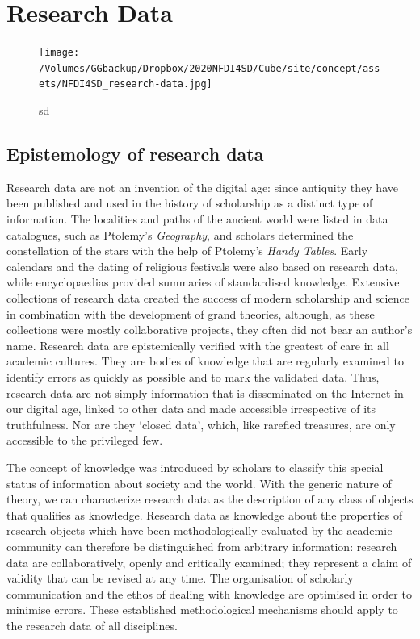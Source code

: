 \documentclass[
  english,
  paper=a4,
  oneside,captions=tableheading
]{scrbook}
\begin{document}
\hypertarget{research-data-1}{%
\section{Research Data}\label{research-data-1}}

\begin{figure}
\centering
\texttt{[image: /Volumes/GGbackup/Dropbox/2020NFDI4SD/Cube/site/concept/assets/NFDI4SD\_research-data.jpg]}
\caption{sd}
\end{figure}

\hypertarget{epistemology-of-research-data}{%
\subsection{Epistemology of research
data}\label{epistemology-of-research-data}}

Research data are not an invention of the digital age: since antiquity
they have been published and used in the history of scholarship as a
distinct type of information. The localities and paths of the ancient
world were listed in data catalogues, such as Ptolemy's
\emph{Geography}, and scholars determined the constellation of the stars
with the help of Ptolemy's \emph{Handy Tables}. Early calendars and the
dating of religious festivals were also based on research data, while
encyclopaedias provided summaries of standardised knowledge. Extensive
collections of research data created the success of modern scholarship
and science in combination with the development of grand theories,
although, as these collections were mostly collaborative projects, they
often did not bear an author's name. Research data are epistemically
verified with the greatest of care in all academic cultures. They are
bodies of knowledge that are regularly examined to identify errors as
quickly as possible and to mark the validated data. Thus, research data
are not simply information that is disseminated on the Internet in our
digital age, linked to other data and made accessible irrespective of
its truthfulness. Nor are they `closed data', which, like rarefied
treasures, are only accessible to the privileged few.

The concept of knowledge was introduced by scholars to classify this
special status of information about society and the world. With the
generic nature of theory, we can characterize research data as the
description of any class of objects that qualifies as knowledge.
Research data as knowledge about the properties of research objects
which have been methodologically evaluated by the academic community can
therefore be distinguished from arbitrary information: research data are
collaboratively, openly and critically examined; they represent a claim
of validity that can be revised at any time. The organisation of
scholarly communication and the ethos of dealing with knowledge are
optimised in order to minimise errors. These established methodological
mechanisms should apply to the research data of all disciplines.
\end{document}
